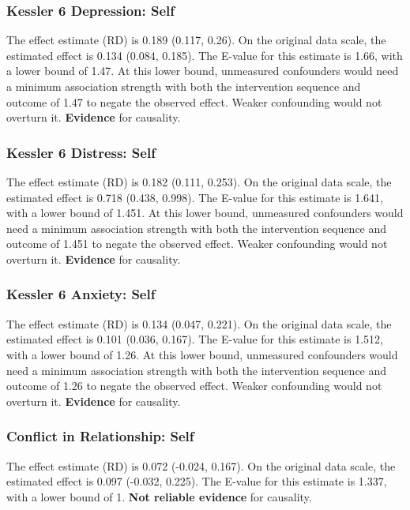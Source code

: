 \documentclass[
  singlecolumn]{article}
\begin{document}
\subsubsection{Kessler 6 Depression:
Self}\label{kessler-6-depression-self-12}

The effect estimate (RD) is 0.189 (0.117, 0.26). On the original data
scale, the estimated effect is 0.134 (0.084, 0.185). The E-value for
this estimate is 1.66, with a lower bound of 1.47. At this lower bound,
unmeasured confounders would need a minimum association strength with
both the intervention sequence and outcome of 1.47 to negate the
observed effect. Weaker confounding would not overturn it.
\textbf{Evidence} for causality.

\subsubsection{Kessler 6 Distress:
Self}\label{kessler-6-distress-self-12}

The effect estimate (RD) is 0.182 (0.111, 0.253). On the original data
scale, the estimated effect is 0.718 (0.438, 0.998). The E-value for
this estimate is 1.641, with a lower bound of 1.451. At this lower
bound, unmeasured confounders would need a minimum association strength
with both the intervention sequence and outcome of 1.451 to negate the
observed effect. Weaker confounding would not overturn it.
\textbf{Evidence} for causality.

\subsubsection{Kessler 6 Anxiety: Self}\label{kessler-6-anxiety-self-12}

The effect estimate (RD) is 0.134 (0.047, 0.221). On the original data
scale, the estimated effect is 0.101 (0.036, 0.167). The E-value for
this estimate is 1.512, with a lower bound of 1.26. At this lower bound,
unmeasured confounders would need a minimum association strength with
both the intervention sequence and outcome of 1.26 to negate the
observed effect. Weaker confounding would not overturn it.
\textbf{Evidence} for causality.

\subsubsection{Conflict in Relationship:
Self}\label{conflict-in-relationship-self-12}

The effect estimate (RD) is 0.072 (-0.024, 0.167). On the original data
scale, the estimated effect is 0.097 (-0.032, 0.225). The E-value for
this estimate is 1.337, with a lower bound of 1. \textbf{Not reliable
evidence} for causality.
\end{document}
